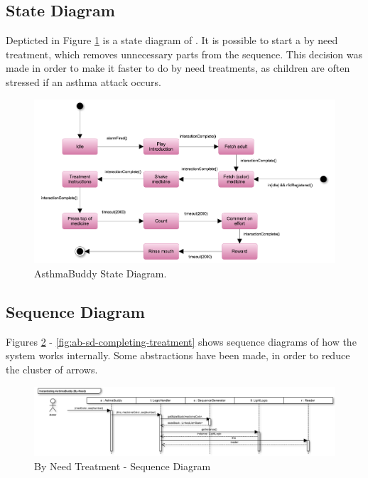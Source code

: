 \subsection{State Diagram}
\label{sec:statediagram}

Depticted in Figure \ref{fig:asthmabuddy_statediagram} is a state diagram of \ab{}. It is possible to start a by need treatment, which removes unnecessary parts from the sequence. This decision was made in order to make it faster to do by need treatments, as children are often stressed if an asthma attack occurs. 

\begin{figure}[H] 
	\centering
		\includegraphics[width=0.7\paperwidth]{Pictures/statediagram.png}
	\caption{AsthmaBuddy State Diagram.}
	\label{fig:asthmabuddy_statediagram}
\end{figure}

\subsection{Sequence Diagram}
Figures \ref{fig:ab-sd-byneed} - \ref{fig:ab-sd-completing-treatment} shows sequence diagrams of how the system works internally. Some abstractions have been made, in order to reduce the cluster of arrows. 

\begin{figure}
	\centering
		\includegraphics[scale=0.6]{Pictures/sd/sd-byneed.png}
	\caption{By Need Treatment - Sequence Diagram}
	\label{fig:ab-sd-byneed}
\end{figure}

